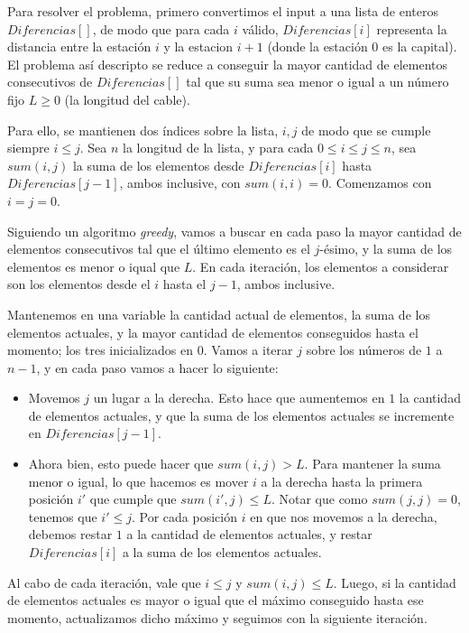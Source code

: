 
\indent Para resolver el problema, primero convertimos el input a una lista de enteros $Diferencias[]$, de modo que para cada $i$ v\'alido, $Diferencias[i]$ representa la distancia entre la estaci\'on $i$ y la estacion $i+1$ (donde la estaci\'on 0 es la capital). El problema as\'i descripto se reduce a conseguir la mayor cantidad de elementos consecutivos de $Diferencias[]$ tal que su suma sea menor o igual a un n\'umero fijo $L \geq 0$ (la longitud del cable).

Para ello, se mantienen dos \'indices sobre la lista, $i, j$ de modo que se cumple siempre $i \leq j$. Sea $n$ la longitud de la lista, y para cada $0 \leq i \leq j \leq n$, sea $sum(i, j)$ la suma de los elementos desde $Diferencias[i]$ hasta $Diferencias[j-1]$, ambos inclusive, con $sum(i, i)=0$. Comenzamos con $i=j=0$.

Siguiendo un algoritmo \textit{greedy}, vamos a buscar en cada paso la mayor cantidad de elementos consecutivos tal que el \'ultimo elemento es el $j$-\'esimo, y la suma de los elementos es menor o iqual que $L$. En cada iteraci\'on, los elementos a considerar son los elementos desde el $i$ hasta el $j-1$, ambos inclusive.

Mantenemos en una variable la cantidad actual de elementos, la suma de los elementos actuales, y la mayor cantidad de elementos conseguidos hasta el momento; los tres inicializados en $0$. Vamos a iterar $j$ sobre los n\'umeros de $1$ a $n-1$, y en cada paso vamos a hacer lo siguiente:

\begin{itemize}
\item
Movemos $j$ un lugar a la derecha. Esto hace que aumentemos en $1$ la cantidad de elementos actuales, y que la suma de los elementos actuales se incremente en $Diferencias[j-1]$. 

\item
Ahora bien, esto puede hacer que  $sum(i, j) > L$. Para mantener la suma menor o igual, lo que hacemos es mover $i$ a la derecha hasta la primera posici\'on $i'$ que cumple que $sum(i', j) \leq L$. Notar que como $sum(j, j) = 0$, tenemos que $i' \leq j$. Por cada posici\'on $i$ en que nos movemos a la derecha, debemos restar $1$ a la cantidad de elementos actuales, y restar $Diferencias[i]$ a la suma de los elementos actuales.
\end{itemize}

Al cabo de cada iteraci\'on, vale que $i\leq j$ y $sum(i, j) \leq L$. Luego, si la cantidad de elementos actuales es mayor o igual que el m\'aximo conseguido hasta ese momento, actualizamos dicho m\'aximo y seguimos con la siguiente iteraci\'on.

